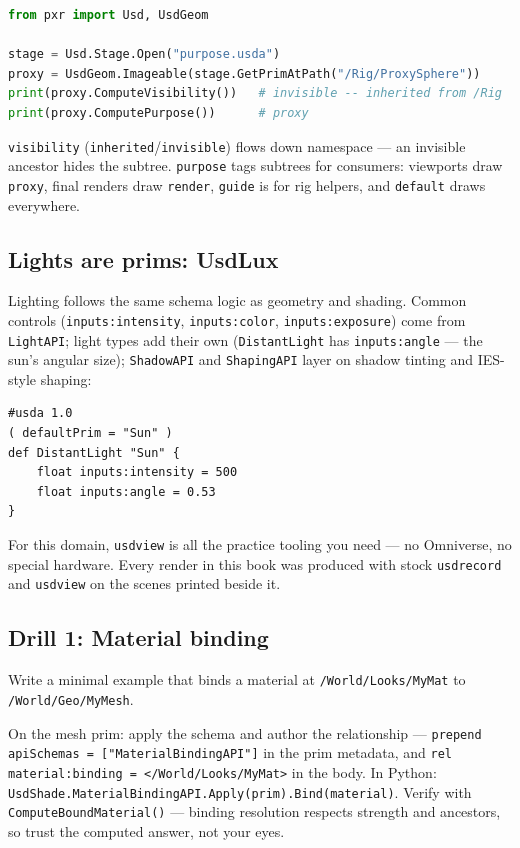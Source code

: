 \begin{lstlisting}[language=Python]
from pxr import Usd, UsdGeom

stage = Usd.Stage.Open("purpose.usda")
proxy = UsdGeom.Imageable(stage.GetPrimAtPath("/Rig/ProxySphere"))
print(proxy.ComputeVisibility())   # invisible -- inherited from /Rig
print(proxy.ComputePurpose())      # proxy
\end{lstlisting}

\noindent\texttt{visibility} (\texttt{inherited}/\texttt{invisible}) flows
down namespace --- an invisible ancestor hides the subtree.
\texttt{purpose} tags subtrees for consumers: viewports draw
\texttt{proxy}, final renders draw \texttt{render}, \texttt{guide} is for
rig helpers, and \texttt{default} draws everywhere.

\subsection{Lights are prims: UsdLux}
Lighting follows the same schema logic as geometry and
shading. Common controls (\texttt{inputs:intensity}, \texttt{inputs:color},
\texttt{inputs:exposure}) come from \texttt{LightAPI}; light types add their
own (\texttt{DistantLight} has \texttt{inputs:angle} --- the sun's angular
size); \texttt{ShadowAPI} and \texttt{ShapingAPI} layer on shadow tinting
and IES-style shaping:

\begin{lstlisting}
#usda 1.0
( defaultPrim = "Sun" )
def DistantLight "Sun" {
    float inputs:intensity = 500
    float inputs:angle = 0.53
}
\end{lstlisting}

\begin{FieldNote}
For this domain, \texttt{usdview} is all the practice tooling you need ---
no Omniverse, no special hardware. Every render in this book was produced
with stock \texttt{usdrecord} and \texttt{usdview} on the scenes printed
beside it.
\end{FieldNote}

\DrillsTitle
\subsection*{Drill 1: Material binding}
Write a minimal example that binds a material at \texttt{/World/Looks/MyMat}
to \texttt{/World/Geo/MyMesh}.
\begin{DrillSolution}
On the mesh prim: apply the schema and author the relationship ---
\texttt{prepend apiSchemas = ["MaterialBindingAPI"]} in the prim metadata,
and \texttt{rel material:binding = </World/Looks/MyMat>} in the body. In
Python: \texttt{UsdShade.MaterialBindingAPI.Apply(prim).Bind(material)}.
Verify with \texttt{ComputeBoundMaterial()} --- binding resolution respects
strength and ancestors, so trust the computed answer, not your eyes.
\end{DrillSolution}

